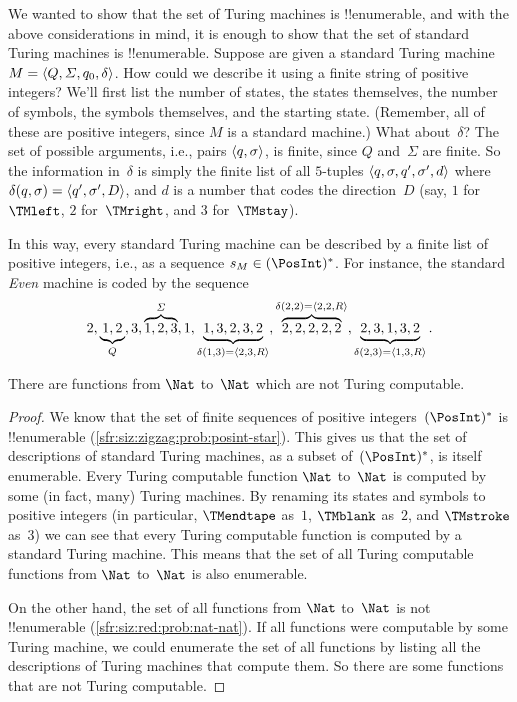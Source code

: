 \documentclass[../../../include/open-logic-section]{subfiles}
\begin{document}
\begin{explain}
We wanted to show that the set of Turing machines is !!{enumerable},
and with the above considerations in mind, it is enough to show that
the set of standard Turing machines is !!{enumerable}. Suppose are
given a standard Turing machine $M = \langle Q, \Sigma, q_0, \delta \rangle$.
How could we describe it using a finite string of positive integers?
We'll first list the number of states, the states themselves, the
number of symbols, the symbols themselves, and the starting state.
(Remember, all of these are positive integers, since $M$ is a standard
machine.)  What about~$\delta$? The set of possible arguments, i.e.,
pairs $\langle q,\sigma \rangle$, is finite, since $Q$ and~$\Sigma$ are
finite. So the information in~$\delta$ is simply the finite list of
all $5$-tuples $\langle q, \sigma, q', \sigma', d \rangle$ where
$\delta(q,\sigma) = \langle q', \sigma', D \rangle$, and $d$ is a number that
codes the direction~$D$ (say, $1$ for~$\TMleft$, $2$ for~$\TMright$,
and $3$ for~$\TMstay$).

In this way, every standard Turing machine can be described by a
finite list of positive integers, i.e., as a sequence $s_M \in
(\PosInt)^*$. For instance, the standard \emph{Even} machine is coded
by the sequence
\[
2, \underbrace{1, 2}_Q, 3, \overbrace{1, 2, 3}^\Sigma, 1, \underbrace{1, 3, 2, 3, 2}_{\delta(1,3) = \langle 2,3,R \rangle}, 
\overbrace{2, 2, 2, 2, 2}^{\delta(2,2) = \langle 2,2,R \rangle},
\underbrace{2, 3, 1, 3, 2}_{\delta(2,3) = \langle 1,3,R \rangle}.
\]
\end{explain}

\begin{thm}
There are functions from $\Nat$ to~$\Nat$ which are not Turing
computable.
\end{thm}

\begin{proof}
We know that the set of finite sequences of positive
integers~$(\PosInt)^*$ is !!{enumerable}
(\cref{sfr:siz:zigzag:prob:posint-star}). This gives us that the set
of descriptions of standard Turing machines, as a subset
of~$(\PosInt)^*$, is itself enumerable.  Every Turing computable
function $\Nat$ to~$\Nat$ is computed by some (in fact, many) Turing
machines. By renaming its states and symbols to positive integers (in
particular, $\TMendtape$ as~$1$, $\TMblank$ as~$2$, and $\TMstroke$
as~$3$) we can see that every Turing computable function is computed
by a standard Turing machine. This means that the set of all Turing
computable functions from $\Nat$ to~$\Nat$ is also enumerable.

On the other hand, the set of all functions from $\Nat$ to~$\Nat$ is
not !!{enumerable} (\cref{sfr:siz:red:prob:nat-nat}). If all functions
were computable by some Turing machine, we could enumerate the set of
all functions by listing all the descriptions of Turing machines that
compute them. So there are some functions that are not Turing
computable. 
\end{proof}
\end{document}

